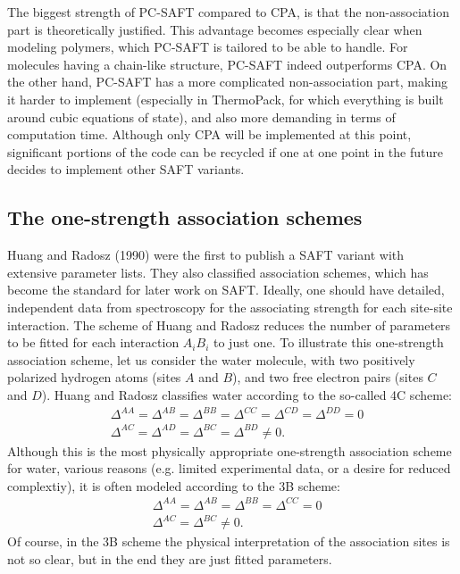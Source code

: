 \documentclass[10pt, a4paper]{article}
\begin{document}
The biggest strength of PC-SAFT compared to CPA, is that the non-association part is theoretically justified. This advantage becomes especially clear when modeling polymers, which PC-SAFT is tailored to be able to handle. For molecules having a chain-like structure, PC-SAFT indeed outperforms CPA. On the other hand, PC-SAFT has a more complicated non-association part, making it harder to implement (especially in ThermoPack, for which everything is built around cubic equations of state), and also more demanding in terms of computation time. Although only CPA will be implemented at this point, significant portions of the code can be recycled if one at one point in the future decides to implement other SAFT variants.

\subsection{The one-strength association schemes}
Huang and Radosz (1990) were the first to publish a SAFT variant with extensive parameter lists. They also classified association schemes, which has become the standard for later work on SAFT. Ideally, one should have detailed, independent data from spectroscopy for the associating strength for each site-site interaction. The scheme of Huang and Radosz reduces the number of parameters to be fitted for each interaction $A_i B_i$ to just one. To illustrate this one-strength association scheme, let us consider the water molecule, with two positively polarized hydrogen atoms (sites $A$ and $B$), and two free electron pairs (sites $C$ and $D$). Huang and Radosz classifies water according to the so-called 4C scheme:
\begin{align*}
&\Delta^{AA} = \Delta^{AB} = \Delta^{BB} = \Delta^{CC} = \Delta^{CD} = \Delta^{DD} = 0 \\
&\Delta^{AC} = \Delta^{AD} = \Delta^{BC} = \Delta^{BD} \neq 0.
\end{align*}
Although this is the most physically appropriate one-strength association scheme for water, various reasons (e.g. limited experimental data, or a desire for reduced complextiy), it is often modeled according to the 3B scheme:
\begin{align*}
&\Delta^{AA} = \Delta^{AB} = \Delta^{BB} = \Delta^{CC} = 0 \\
&\Delta^{AC} = \Delta^{BC} \neq 0.
\end{align*}
Of course, in the 3B scheme the physical interpretation of the association sites is not so clear, but in the end they are just fitted parameters.
\end{document}
